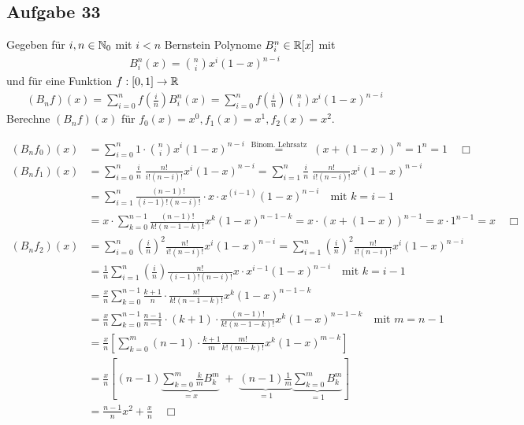 \subsection*{Aufgabe 33}
Gegeben für $i, n \in \mathbb N_0$ mit $i < n$ Bernstein Polynome $B_i^n \in \mathbb R[x]$ mit
\begin{align}
  B_i^n(x) = \binom{n}{i} x^i(1 - x)^{n-i}
\end{align}
und für eine Funktion $f: [0,1] \rightarrow \mathbb R$
\begin{align}
  (B_n f)(x) = \sum_{i = 0}^n f\left(\frac{i}{n}\right) B_i^n(x) =
  \sum_{i = 0}^n f\left(\frac{i}{n}\right) \binom{n}{i} x^i(1 - x)^{n-i}
\end{align}
Berechne $(B_n f)(x)$ für $f_0(x) = x^0, f_1(x) = x^1, f_2(x) = x^2$.

\begin{align*}
  (B_n f_0)(x) &= \sum_{i = 0}^n 1 \cdot \binom{n}{i} x^i(1 - x)^{n-i}
    \; \overset{\text{Binom. Lehrsatz}}{=} \; \left( x + (1 -x) \right)^n = 1^n = 1 \quad \Box\\
  (B_n f_1)(x) &= \sum_{i = 0}^n \frac{i}{n} \; \frac{n!}{i! (n-i)!} x^i(1 - x)^{n-i} =
    \sum_{i = 1}^n \frac{i}{n} \; \frac{n!}{i! (n-i)!} x^i(1 - x)^{n-i} \\
    & = \sum_{i = 1}^n \frac{(n-1)!}{(i-1)! (n-i)!} \cdot x \cdot x^{(i-1)}(1 - x)^{n-i}
    \quad \text{mit $k = i - 1$} \\
    & = x  \cdot \sum_{k = 0}^{n-1} \frac{(n-1)!}{k! (n-1-k)!} x^k(1 - x)^{n-1-k}
    = x \cdot \left( x + (1 -x) \right)^{n-1} = x \cdot 1^{n-1} = x  \quad \Box \\
  (B_n f_2)(x) &= \sum_{i = 0}^n \left(\frac{i}{n}\right)^2 \frac{n!}{i! (n-i)!} x^i(1 - x)^{n-i} =
    \sum_{i = 1}^n \left(\frac{i}{n}\right)^2 \frac{n!}{i! (n-i)!} x^i(1 - x)^{n-i} \\
  & = \frac{1}{n} \sum_{i = 1}^n \left(\frac{i}{n}\right) \frac{n!}{(i-1)! (n-i)!} x \cdot x^{i-1}(1 - x)^{n-i}
  \quad \text{mit $k = i - 1$} \\
   & = \frac{x}{n} \sum_{k = 0}^{n-1} \frac{k+1}{n} \cdot \frac{n!}{k! (n-1-k)!} x^{k}(1 - x)^{n -1-k}\\
   & = \frac{x}{n} \sum_{k = 0}^{n-1} \frac{n-1}{n-1} \cdot (k+1) \cdot \frac{(n-1)!}{k! (n-1-k)!} x^{k}(1 - x)^{n -1-k}\quad \text{mit $m = n - 1$} \\
   & = \frac{x}{n} \left[\sum_{k = 0}^{m} (n-1) \cdot \frac{k+1}{m} \frac{m!}{k! (m-k)!} x^{k}(1 - x)^{m-k} \right]\\
   & = \frac{x}{n} \left[(n-1) \underbrace{\sum_{k = 0}^{m} \frac{k}{m} B_k^m}_{= x} \; + \;
   \underbrace{(n-1)\frac{1}{m}}_{= 1} \underbrace{\sum_{k = 0}^{m} B_k^m}_{= 1}\right]\\
   & = \frac{n-1}{n} x^2   + \frac{x}{n} \quad \Box
\end{align*}

